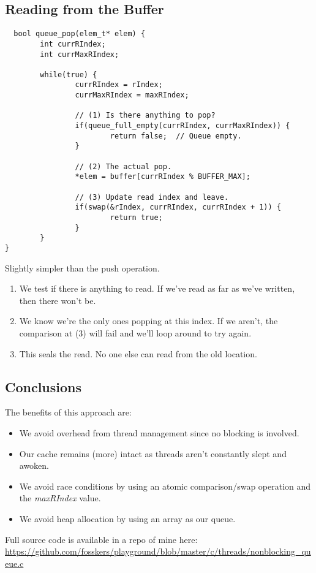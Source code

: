 \documentclass[titlepage]{article}
\begin{document}
\subsection{Reading from the Buffer}
\begin{lstlisting}
  bool queue_pop(elem_t* elem) {
        int currRIndex;
        int currMaxRIndex;
    
        while(true) {
                currRIndex = rIndex;
                currMaxRIndex = maxRIndex;

                // (1) Is there anything to pop?
                if(queue_full_empty(currRIndex, currMaxRIndex)) {
                        return false;  // Queue empty.
                }

                // (2) The actual pop.
                *elem = buffer[currRIndex % BUFFER_MAX];

                // (3) Update read index and leave.
                if(swap(&rIndex, currRIndex, currRIndex + 1)) {
                        return true;
                }
        }
}
\end{lstlisting}
Slightly simpler than the push operation.
\begin{enumerate}
\item We test if there is anything to read. If we've read as far as we've written,
  then there won't be.
\item We know we're the only ones popping at this index. If we aren't, the
  comparison at (3) will fail and we'll loop around to try again.
\item This seals the read. No one else can read from the old location.
\end{enumerate}

\subsection{Conclusions}
The benefits of this approach are:
\begin{itemize}
\item We avoid overhead from thread management since no blocking is involved.
\item Our cache remains (more) intact as threads aren't constantly slept
  and awoken.
\item We avoid race conditions by using an atomic comparison/swap operation
  and the \emph{maxRIndex} value.
\item We avoid heap allocation by using an array as our queue.
\end{itemize}

Full source code is available in a repo of mine here:\\
\url{https://github.com/fosskers/playground/blob/master/c/threads/nonblocking_queue.c}
\end{document}
